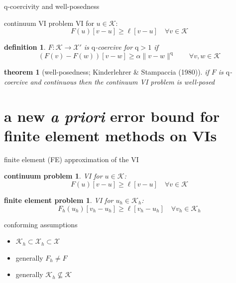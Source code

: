 \documentclass[10pt,svgnames]{beamer}
\newtheorem*{defn}{definition}
\newtheorem*{thm}{theorem}
\newtheorem*{cproblem}{continuum problem}
\newtheorem*{feproblem}{finite element problem}
\newcommand{\cK}{\mathcal{K}}
\newcommand{\cX}{\mathcal{X}}
\newcommand{\qq}{\mathrm{q}}
\newcommand{\aler}[1]{{\color{FireBrick} #1}}
\begin{document}
\begin{frame}{$\qq$-coercivity and well-posedness}

\begin{block}{continuum VI problem}
VI for $u \in \cK$:
$$F(u)[v-u] \ge \ell[v-u] \quad \forall v \in \cK$$
\end{block}

\begin{defn} $F:\cK \to \cX'$ is \aler{$\qq$-coercive} for $\qq>1$ if
  $$\left(F(v)-F(w)\right)[v-w] \ge \alpha \|v-w\|^\qq \qquad \forall v,w \in \cK$$
\end{defn}

\begin{thm}[well-posedness; Kinderlehrer \& Stampaccia (1980)] 
if $F$ is $\qq$-coercive and continuous then the continuum VI problem is well-posed
\end{thm}
\end{frame}


\AtBeginSection[] {
    \begin{frame}{Outline}
    \setbeamertemplate{section in toc}[sections numbered]
    \tableofcontents[currentsection]%
    \end{frame}
}

\section{a new \emph{a priori} error bound for finite element methods on VIs}


\begin{frame}{finite element (FE) approximation of the VI}

\begin{cproblem}
VI for $u \in \cK$:
$$F(u)[v-u] \ge \ell[v-u] \quad \forall v \in \cK$$
\end{cproblem}

\begin{feproblem}
VI for $u_h \in \cK_h$:
$$F_h(u_h)[v_h-u_h] \ge \ell[v_h-u_h] \quad \forall v_h \in \cK_h$$
\end{feproblem}

conforming assumptions\only<2-3>{\aler{?}}
\begin{itemize}
\item $\cK_h \subset \cX_h \subset \cX$

\item<2-3> \aler{generally $F_h\neq F$}

\item<3> \aler{generally $\cK_h \not\subseteq \cK$}
\end{itemize}

\vspace{-25mm}
\hfill {}
\end{frame}
\end{document}
